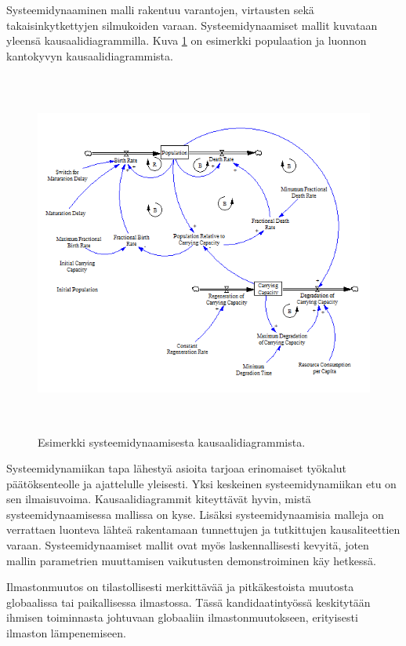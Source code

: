 \documentclass[finnish,12pt,a4paper,pdftex]{article}
\begin{document}
\begin{onehalfspacing}

Systeemidynaaminen malli rakentuu varantojen, virtausten sekä takaisinkytkettyjen silmukoiden varaan. Systeemidynaamiset mallit kuvataan yleensä kausaalidiagrammilla.  Kuva \ref{sysdyn_example} on esimerkki populaation ja luonnon kantokyvyn kausaalidiagrammista. 

\begin{figure}[htb]
\centering \includegraphics[height=12cm]{sysdyn_example}
\caption{Esimerkki systeemidynaamisesta kausaalidiagrammista. \label{sysdyn_example}}
\end{figure}

Systeemidynamiikan tapa lähestyä asioita tarjoaa erinomaiset työkalut päätöksenteolle ja ajattelulle yleisesti. Yksi keskeinen systeemidynamiikan etu on sen ilmaisuvoima. Kausaalidiagrammit kiteyttävät hyvin, mistä systeemidynaamisessa mallissa on kyse. Lisäksi systeemidynaamisia malleja on verrattaen luonteva lähteä rakentamaan tunnettujen ja tutkittujen kausaliteettien varaan. Systeemidynaamiset mallit ovat myös laskennallisesti kevyitä, joten mallin parametrien muuttamisen vaikutusten demonstroiminen käy hetkessä.  

Ilmastonmuutos on tilastollisesti merkittävää ja pitkäkestoista muutosta globaalissa tai paikallisessa ilmastossa. Tässä kandidaatintyössä keskitytään ihmisen toiminnasta johtuvaan globaaliin ilmastonmuutokseen, erityisesti ilmaston lämpenemiseen. 


\end{onehalfspacing}
\end{document}

